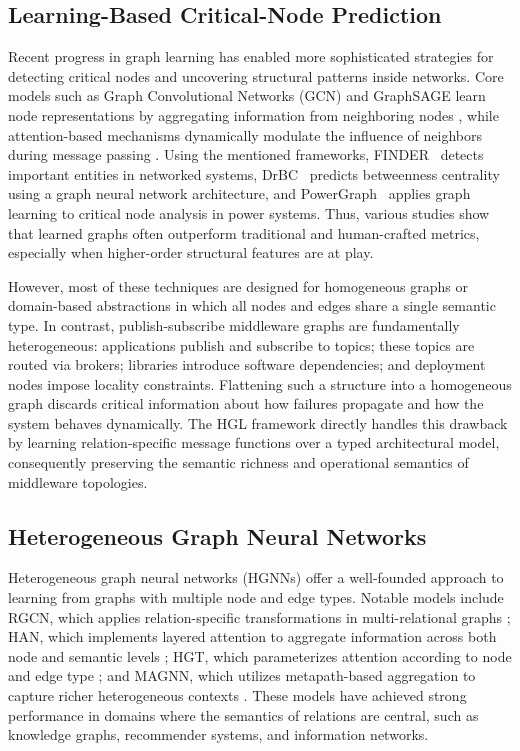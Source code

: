\documentclass[review]{elsarticle}
\begin{document}
\subsection{Learning-Based Critical-Node Prediction}

Recent progress in graph learning has enabled more sophisticated strategies for detecting critical
nodes and uncovering structural patterns inside networks. Core models such as Graph Convolutional
Networks (GCN) and GraphSAGE learn node representations by aggregating information from neighboring
nodes \cite{Kipf2017,Hamilton2017}, while attention-based mechanisms dynamically modulate the
influence of neighbors during message passing \cite{Velickovic2018}. Using the mentioned
frameworks, FINDER~\cite{Fan2020} detects important entities in networked systems,
DrBC~\cite{Munikoti2022} predicts betweenness centrality using a graph neural network architecture,
and PowerGraph~\cite{Munikoti2024} applies graph learning to critical node analysis in power
systems. Thus, various studies show that learned graphs often outperform traditional and
human-crafted metrics, especially when higher-order structural features are at play.

However, most of these techniques are designed for homogeneous graphs or domain-based abstractions
in which all nodes and edges share a single semantic type. In contrast, publish-subscribe
middleware graphs are fundamentally heterogeneous: applications publish and subscribe to topics;
these topics are routed via brokers; libraries introduce software dependencies; and deployment
nodes impose locality constraints. Flattening such a structure into a homogeneous graph discards
critical information about how failures propagate and how the system behaves dynamically. The HGL
framework directly handles this drawback by learning relation-specific message functions over a
typed architectural model, consequently preserving the semantic richness and operational semantics
of middleware topologies.

\subsection{Heterogeneous Graph Neural Networks}

Heterogeneous graph neural networks (HGNNs) offer a well-founded approach to learning from graphs
with multiple node and edge types. Notable models include RGCN, which applies relation-specific
transformations in multi-relational graphs \cite{Schlichtkrull2018}; HAN, which implements layered
attention to aggregate information across both node and semantic levels \cite{Wang2019}; HGT, which
parameterizes attention according to node and edge type \cite{Hu2020}; and MAGNN, which utilizes
metapath-based aggregation to capture richer heterogeneous contexts \cite{Fu2020}. These models
have achieved strong performance in domains where the semantics of relations are central, such as
knowledge graphs, recommender systems, and information networks.
\end{document}

